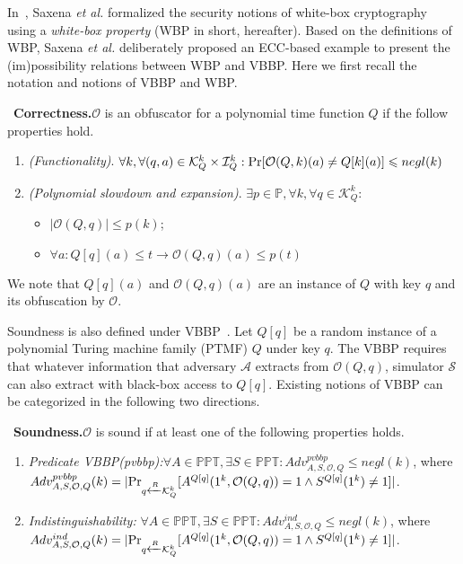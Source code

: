 \documentclass{SCIS2018}
\begin{document}
In~\cite{DBLP:conf/isw/SaxenaWP09}, Saxena \textit{et al.} formalized the security notions of white-box cryptography using a \textit{white-box property} (WBP in short, hereafter). Based on the definitions of WBP, Saxena \textit{et al.} deliberately proposed an ECC-based example to present the (im)possibility relations between WBP and VBBP. Here we first recall the notation and notions of VBBP and WBP.

\cite{DBLP:conf/isw/SaxenaWP09}~\textbf{Correctness.}{$\mathcal{O}$ is an obfuscator for a polynomial time function $Q$ if the follow properties hold.}
\begin{enumerate}

\item \textit{(Functionality)}. $\forall k, \forall (q,a)\in \mathcal{K}^{k}_{Q}\times \mathcal{I}^{k}_{Q}:\textmd{Pr}[\mathcal{O}(Q,k)(a) \neq Q [k](a)]\leq negl(k)$

\item \textit{(Polynomial slowdown and expansion)}. $\exists p \in \mathbb{P}, \forall k, \forall q \in \mathcal{K}^{k}_{Q}:$
\begin{itemize}
    \item $|\mathcal{O}(Q, q)| \leq p(k)$;
    \item $\forall a: Q[q](a) \leq t \rightarrow \mathcal{O}(Q,q)(a) \leq p(t)$
\end{itemize}
\end{enumerate}

We note that $Q[q](a)$ and $\mathcal{O}(Q,q)(a)$ are an instance of $Q$ with key $q$ and its obfuscation by $\mathcal{O}$.

Soundness is also defined under VBBP~\cite{DBLP:conf/crypto/BarakGIRSVY01}. Let $Q[q]$ be a random instance of a polynomial Turing machine family (PTMF) $Q$ under key $q$. The VBBP requires that whatever information that adversary $\mathcal{A}$ extracts from $\mathcal{O}(Q,q)$, simulator $\mathcal{S}$ can also extract with black-box access to $Q[q]$. Existing notions of VBBP can be categorized in the following two directions.

\cite{DBLP:conf/isw/SaxenaWP09}~\textbf{Soundness.}{$\mathcal{O}$ is sound if at least one of the following properties holds.}
\begin{enumerate}
\item \textit{Predicate VBBP(pvbbp):}$\forall A\in \mathbb{PPT}, \exists S \in \mathbb{PPT}: Adv_{A, S, \mathcal{O}, Q}^{pvbbp} \leq negl(k)$, where \\ $Adv_{A, S, \mathcal{O}, Q}^{pvbbp}(k) =|\textmd{Pr}_{q \xleftarrow{R} \mathcal{K}^{k}_{Q}}[A^{Q[q]}(1^{k},\mathcal{O}(Q,q))=1 \wedge S^{Q[q]}(1^{k})\neq 1]|$.

\item \textit{Indistinguishability:} $\forall A\in \mathbb{PPT}, \exists S \in \mathbb{PPT}: Adv_{A, S, \mathcal{O}, Q}^{ind} \leq negl(k)$, where \\ $Adv_{A, S, \mathcal{O}, Q}^{ind}(k) =|\textmd{Pr}_{q \xleftarrow{R} \mathcal{K}^{k}_{Q}}[A^{Q[q]}(1^{k},\mathcal{O}(Q,q))=1 \wedge S^{Q[q]}(1^{k})\neq 1]|$.
\end{enumerate}
\end{document}
